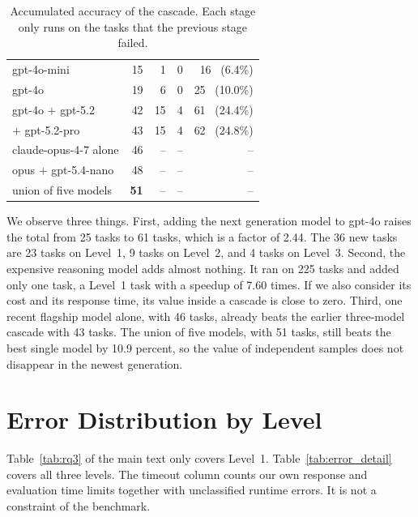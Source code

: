 \begin{table}[h]
\centering
\small
\setlength{\tabcolsep}{4pt}
\caption{Accumulated accuracy of the cascade. Each stage only runs on the tasks that the previous
stage failed.}
\label{tab:cascading}
\begin{tabular}{@{}lrrrr@{}}
\toprule
\headrow{Configuration} & \headrow{L1} & \headrow{L2} & \headrow{L3} & \headrow{Total (/250)} \\
\midrule
gpt-4o-mini            & 15 & 1  & 0 & 16 \ (6.4\%) \\
gpt-4o                 & 19 & 6  & 0 & 25 \ (10.0\%) \\
gpt-4o $+$ gpt-5.2     & 42 & 15 & 4 & 61 \ (24.4\%) \\
\quad $+$ gpt-5.2-pro  & 43 & 15 & 4 & 62 \ (24.8\%) \\
\midrule
claude-opus-4-7 alone  & 46 & -- & -- & -- \\
opus $+$ gpt-5.4-nano  & 48 & -- & -- & -- \\
union of five models   & \textbf{51} & -- & -- & -- \\
\bottomrule
\end{tabular}
\end{table}

We observe three things. First, adding the next generation model to gpt-4o raises the total from 25
tasks to 61 tasks, which is a factor of 2.44. The 36 new tasks are 23 tasks on Level~1, 9 tasks on
Level~2, and 4 tasks on Level~3. Second, the expensive reasoning model adds almost nothing. It ran
on 225 tasks and added only one task, a Level~1 task with a speedup of 7.60 times. If we also
consider its cost and its response time, its value inside a cascade is close to zero. Third, one
recent flagship model alone, with 46 tasks, already beats the earlier three-model cascade with 43
tasks. The union of five models, with 51 tasks, still beats the best single model by 10.9 percent,
so the value of independent samples does not disappear in the newest generation.

\section{Error Distribution by Level}

Table~\ref{tab:rq3} of the main text only covers Level~1. Table~\ref{tab:error_detail} covers all three levels.
The timeout column counts our own response and evaluation time limits together with unclassified
runtime errors. It is not a constraint of the benchmark.

